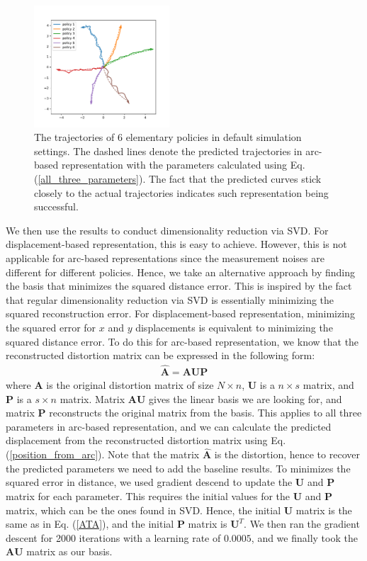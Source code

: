 \begin{figure}[h]
\centering
\includegraphics[width=0.45\textwidth]{original_trajectories_1.pdf}
\caption{The trajectories of 6 elementary policies in default simulation settings.
The dashed lines denote the predicted trajectories in arc-based representation with the parameters calculated using Eq. (\ref{all_three_parameters}).
The fact that the predicted curves stick closely to the actual trajectories indicates such representation being successful.
}
\label{baseline_trajectories}
\end{figure}


We then use the results to conduct dimensionality reduction via SVD.
For displacement-based representation, this is easy to achieve.
However, this is not applicable for arc-based representations since the measurement noises are different for different policies.
Hence, we take an alternative approach by finding the basis that minimizes the squared distance error.
This is inspired by the fact that regular dimensionality reduction via SVD is essentially minimizing the squared reconstruction error.
For displacement-based representation, minimizing the squared error for $x$ and $y$ displacements is equivalent to minimizing the squared distance error. 
To do this for arc-based representation, we know that the reconstructed distortion matrix can be expressed in the following form:
\begin{equation}
\begin{gathered}
%
\hat{\bm{A}} = \bm{A} \bm{U} \bm{P}
%
\end{gathered}
\label{SVD_for_arc}
\end{equation}
where $\bm{A}$ is the original distortion matrix of size $N \times n$, $\bm{U}$ is a $n \times s$ matrix, and $\bm{P}$ is a $s \times n$ matrix.
Matrix $\bm{A} \bm{U}$ gives the linear basis we are looking for, and matrix $\bm{P}$ reconstructs the original matrix from the basis.
This applies to all three parameters in arc-based representation, and we can calculate the predicted displacement from the reconstructed distortion matrix using Eq. (\ref{position_from_arc}).
Note that the matrix $\hat{\bm{A}}$ is the distortion, hence to recover the predicted parameters we need to add the baseline results.
To minimizes the squared error in distance, we used gradient descend to update the $\bm{U}$ and $\bm{P}$ matrix for each parameter.
This requires the initial values for the $\bm{U}$ and $\bm{P}$ matrix, which can be the ones found in SVD.
Hence, the initial $\bm{U}$ matrix is the same as in Eq. (\ref{ATA}), and the initial $\bm{P}$ matrix is $\bm{U}^T$.
We then ran the gradient descent for 2000 iterations with a learning rate of $0.0005$, and we finally took the $\bm{A} \bm{U}$ matrix as our basis.


